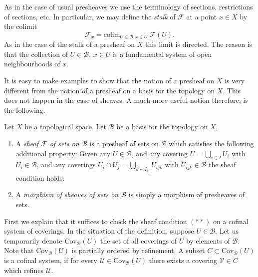 \noindent
As in the case of usual presheaves we use the terminology of sections,
restrictions of sections, etc. In particular, we may define the
{\it stalk} of $\mathcal{F}$ at a point $x \in X$ by the
colimit
$$
\mathcal{F}_x = \text{colim}_{U\in \mathcal{B}, x\in U}\ \mathcal{F}(U).
$$
As in the case of the stalk of a presheaf on $X$ this limit is
directed. The reason is that the collection of $U\in \mathcal{B}$,
$x \in U$ is a fundamental system of open neighbourhoods of $x$.

\medskip\noindent
It is easy to make examples to show that the notion of a presheaf
on $X$ is very different from the notion of a presheaf on a basis
for the topology on $X$. This does not happen in the case of
sheaves. A much more useful notion therefore, is the following.

\begin{definition}
\label{definition-sheaf-basis}
Let $X$ be a topological space. Let $\mathcal{B}$ be a
basis for the topology on $X$.
\begin{enumerate}
\item A {\it sheaf $\mathcal{F}$ of sets on $\mathcal{B}$} is a presheaf
of sets on $\mathcal{B}$ which satisfies the following additional
property: Given any $U \in \mathcal{B}$, and any covering
$U = \bigcup_{i \in I} U_i$ with $U_i \in \mathcal{B}$, and
any coverings $U_i \cap U_j = \bigcup_{k \in I_{ij}} U_{ijk}$ with
$U_{ijk} \in \mathcal{B}$ the sheaf condition holds:
\item A {\it morphism of sheaves of sets on $\mathcal{B}$} is simply a
morphism of presheaves of sets.
\end{enumerate}
\end{definition}

\noindent
First we explain that it suffices to
check the sheaf condition $(**)$
on a cofinal system of coverings.
In the situation of the definition, suppose
$U \in \mathcal{B}$. Let us temporarily denote
$\text{Cov}_{\mathcal{B}}(U)$ the set of all coverings
of $U$ by elements of $\mathcal{B}$.
Note that $\text{Cov}_{\mathcal{B}}(U)$
is partially ordered by refinement.
A subset $C \subset \text{Cov}_{\mathcal{B}}(U)$ is a
cofinal system, if for every $\mathcal{U} \in \text{Cov}_{\mathcal{B}}(U)$
there exists a covering $\mathcal{V} \in C$ which refines $\mathcal{U}$.

